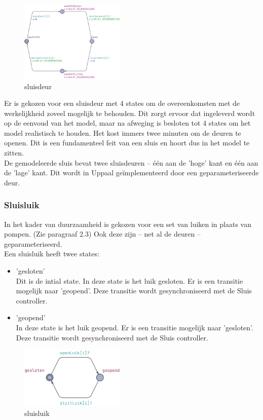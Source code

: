 \documentclass{article} %
\begin{document}
\begin{figure}[h]
\includegraphics[width=5cm]{sluisdeur.png}
\centering    
\caption{sluisdeur}
\end{figure}

Er is gekozen voor een sluisdeur met 4 states om de overeenkomsten met de werkelijkheid zoveel mogelijk te behouden. Dit zorgt ervoor dat ingeleverd wordt op de eenvoud van het model, maar na afweging is besloten tot 4 states om het model realistisch te houden. Het kost immers twee minuten om de deuren te openen. Dit is een fundamenteel feit van een sluis en hoort dus in het model te zitten. \\
De gemodeleerde sluis bevat twee sluisdeuren -- één aan de 'hoge' kant en één aan de 'lage' kant. Dit wordt in Uppaal geïmplementeerd door een geparameteriseerde deur.

\newpage

\subsubsection{Sluisluik}

In het kader van duurzaamheid is gekozen voor een set van luiken in plaats van pompen. (Zie paragraaf 2.3) Ook deze zijn -- net al de deuren -- geparameteriseerd. \\
Een sluisluik heeft twee states:

\begin{itemize}
    \item 'gesloten' \\
        Dit is de intial state. In deze state is het luik gesloten. Er is een transitie mogelijk naar 'geopend'. Deze transitie wordt gesynchroniseerd met de Sluis controller.
    \item 'geopend' \\
        In deze state is het luik geopend. Er is een transitie mogelijk naar 'gesloten'. Deze transitie wordt gesynchroniseerd met de Sluis controller.
\end{itemize}

\begin{figure}[h]
\includegraphics[width=5cm]{sluisluik.png}
\centering    
\caption{sluisluik}
\end{figure}
\end{document}
